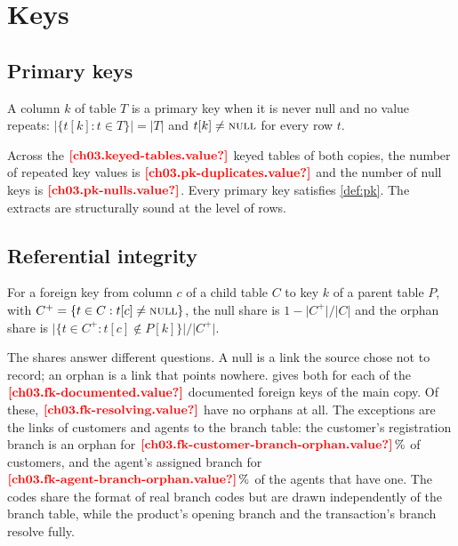

\section{Keys}\label{sec:inv-keys}

\subsection{Primary keys}

\begin{definition}\label{def:pk}
A column $k$ of table $T$ is a primary key when it is never null and no value repeats:
$\lvert\{t[k] : t \in T\}\rvert = \lvert T \rvert$ and $t[k] \neq \textsc{null}$ for every row $t$.
\end{definition}

Across the $\est{ch03.keyed-tables}{value}$ keyed tables of both copies, the number of repeated key values is
$\est{ch03.pk-duplicates}{value}$ and the number of null keys is $\est{ch03.pk-nulls}{value}$. Every primary key
satisfies \cref{def:pk}. The extracts are structurally sound at the level of rows.

\subsection{Referential integrity}

\begin{definition}\label{def:orphan}
For a foreign key from column $c$ of a child table $C$ to key $k$ of a parent table $P$, with
$C^{+} = \{t \in C : t[c] \neq \textsc{null}\}$, the null share is $1 - \lvert C^{+}\rvert / \lvert C \rvert$ and
the orphan share is $\lvert\{t \in C^{+} : t[c] \notin P[k]\}\rvert / \lvert C^{+} \rvert$.
\end{definition}

The shares answer different questions. A null is a link the source chose not to record; an orphan is a link that
points nowhere.  gives both for each of the $\est{ch03.fk-documented}{value}$ documented
foreign keys of the main copy. Of these, $\est{ch03.fk-resolving}{value}$ have no orphans at all. The exceptions are
the links of customers and agents to the branch table: the customer's registration branch is an orphan for
$\est{ch03.fk-customer-branch-orphan}{value}\,\%$ of customers, and the agent's assigned branch for
$\est{ch03.fk-agent-branch-orphan}{value}\,\%$ of the agents that have one. The codes share the format of real branch
codes but are drawn independently of the branch table, while the product's opening branch and the transaction's branch
resolve fully.


